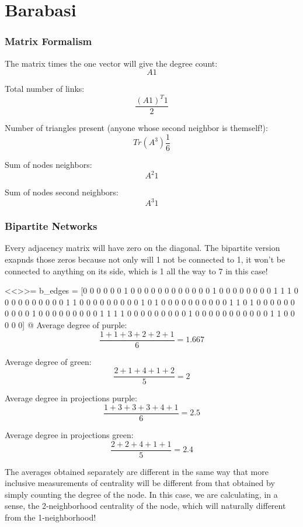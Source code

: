 \documentclass[a4paper,12pt]{article}
\begin{document}
\section*{Barabasi}

\subsubsection*{Matrix Formalism}

The matrix times the one vector will give the degree count:
$$
A1
$$

Total number of links:
$$
\frac{(A 1)^T1 }{2}
$$

Number of triangles present (anyone whose second neighbor is themself!):
$$
Tr(A^3)\frac{1}{6}
$$

Sum of nodes neighbors:
$$
A^2 1
$$

Sum of nodes second neighbors:
$$
A^3 1
$$

\subsubsection*{Bipartite Networks}

Every adjacency matrix will have zero on the diagonal. The bipartite version exapnds those zeros because not only will 1 not be connected to 1, it won't be connected to anything on its side, which is 1 all the way to 7 in this case!

<<>>=
b_edges = [0 0 0 0 0 0 1 0 0 0 0
           0 0 0 0 0 0 0 0 1 0 0
           0 0 0 0 0 0 1 1 1 0 0
           0 0 0 0 0 0 0 0 1 1 0
           0 0 0 0 0 0 0 0 1 0 1
           0 0 0 0 0 0 0 0 0 0 1
           1 0 1 0 0 0 0 0 0 0 0
           0 0 1 0 0 0 0 0 0 0 0
           0 1 1 1 1 0 0 0 0 0 0
           0 0 0 1 0 0 0 0 0 0 0
           0 0 0 0 1 1 0 0 0 0 0]
@
Average degree of purple:
$$
\frac{1 + 1 + 3 + 2 + 2 + 1}{6} = 1.667
$$

Average degree of green:
$$
\frac{2 + 1 + 4 + 1 + 2}{5} = 2
$$

Average degree in projections purple:
$$
\frac{1 + 3 + 3 + 3 + 4 + 1}{6} = 2.5
$$

Average degree in projections green:
$$
\frac{2 + 2 + 4 + 1 + 1}{5} = 2.4
$$

The averages obtained separately are different in the same way that more inclusive measurements of centrality will be different from that obtained by simply counting the degree of the node. In this case, we are calculating, in a sense, the 2-neighborhood centrality of the node, which will naturally different from the 1-neighborhood!
\end{document}
